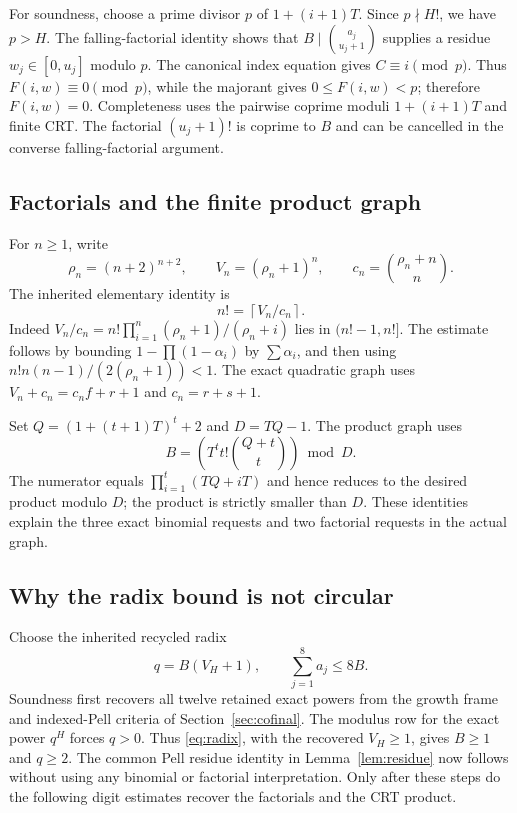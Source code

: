 \documentclass[10pt,letterpaper]{article}
\theoremstyle{remark}\newtheorem{remark}[theorem]{Remark}
\begin{document}
For soundness, choose a prime divisor $p$ of $1+(i+1)T$. Since $p\nmid H!$,
we have $p>H$. The falling-factorial identity shows that
$B\mid\binom{a_j}{u_j+1}$ supplies a residue $w_j\in[0,u_j]$ modulo $p$.
The canonical index equation gives $C\equiv i\pmod p$. Thus
$F(i,w)\equiv0\pmod p$, while the majorant gives $0\le F(i,w)<p$;
therefore $F(i,w)=0$. Completeness uses the pairwise coprime moduli
$1+(i+1)T$ and finite CRT. The factorial $(u_j+1)!$ is coprime to $B$
and can be cancelled in the converse falling-factorial argument.

\subsection{Factorials and the finite product graph}

For $n\ge1$, write
\[
 \rho_n=(n+2)^{n+2},\qquad V_n=(\rho_n+1)^n,
 \qquad c_n=\binom{\rho_n+n}{n}.
\]
The inherited elementary identity is
\begin{equation}\label{eq:factorial}
 n!=\left\lceil V_n/c_n\right\rceil.
\end{equation}
Indeed $V_n/c_n=n!\prod_{i=1}^n(\rho_n+1)/(\rho_n+i)$ lies in
$(n!-1,n!]$. The estimate follows by bounding
$1-\prod(1-\alpha_i)$ by $\sum\alpha_i$, and then using
$n!n(n-1)/(2(\rho_n+1))<1$. The exact quadratic graph uses
$V_n+c_n=c_nf+r+1$ and $c_n=r+s+1$.

Set $Q=(1+(t+1)T)^t+2$ and $D=TQ-1$. The product graph uses
\begin{equation}\label{eq:product}
 B=\left(T^t t!\binom{Q+t}{t}\right)\bmod D.
\end{equation}
The numerator equals $\prod_{i=1}^t(TQ+iT)$ and hence reduces to the
desired product modulo $D$; the product is strictly smaller than $D$.
These identities explain the three exact binomial requests and two
factorial requests in the actual graph.

\subsection{Why the radix bound is not circular}

Choose the inherited recycled radix
\begin{equation}\label{eq:radix}
 q=B(V_H+1),\qquad \sum_{j=1}^8 a_j\le8B.
\end{equation}
Soundness first recovers all twelve retained exact powers from the growth
frame and indexed-Pell criteria of Section~\ref{sec:cofinal}. The modulus
row for the exact power $q^H$ forces $q>0$. Thus \eqref{eq:radix}, with
the recovered $V_H\ge1$, gives $B\ge1$ and $q\ge2$. The common Pell
residue identity in Lemma~\ref{lem:residue} now follows without using any
binomial or factorial interpretation. Only after these steps do the
following digit estimates recover the factorials and the CRT product.
\end{document}
